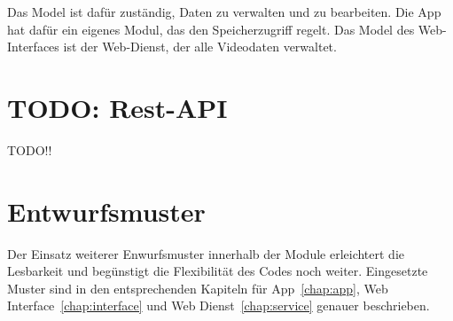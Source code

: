 Das Model ist dafür zuständig, Daten zu verwalten und zu bearbeiten. Die App hat dafür ein eigenes Modul, das den Speicherzugriff regelt. Das Model des Web-Interfaces ist der Web-Dienst, der alle Videodaten verwaltet.\newline\par

\section{TODO: Rest-API} \label{allg:Rest}
TODO!!

\section{Entwurfsmuster} \label{allg:Entwurfsmuster}
Der Einsatz weiterer Enwurfsmuster innerhalb der Module erleichtert die Lesbarkeit und begünstigt die Flexibilität des Codes noch weiter. Eingesetzte Muster sind in den entsprechenden Kapiteln für App~\eqref{chap:app}, Web Interface~\eqref{chap:interface} und Web Dienst~\eqref{chap:service} genauer beschrieben.